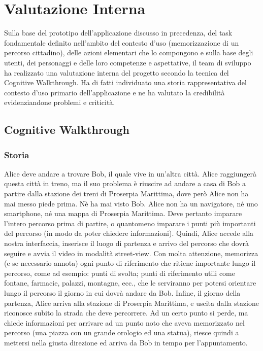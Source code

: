 \documentclass[12pt,a4paper,openright, notitlepage]{report}
\begin{document}

\chapter{Valutazione Interna}

Sulla base del prototipo dell’applicazione discusso in precedenza, del task fondamentale definito nell’ambito del contesto d’uso (memorizzazione di un percorso cittadino), delle azioni elementari che lo compongono e sulla base degli utenti, dei personaggi e delle loro competenze e aspettative, il team di sviluppo ha realizzato una valutazione interna del progetto secondo la tecnica del Cognitive Walkthrough. Ha di fatti individuato una storia rappresentativa del contesto d’uso primario dell’applicazione e ne ha valutato la credibilità evidenziandone problemi e criticità.

\section{Cognitive Walkthrough}

\subsection{Storia}

Alice deve andare a trovare Bob, il quale vive in un’altra città. Alice raggiungerà questa città in treno, ma il suo problema è riuscire ad andare a casa di Bob a partire dalla stazione dei treni di Proserpia Marittima, dove però Alice non ha mai messo piede prima. Nè ha mai visto Bob. Alice non ha un navigatore, né uno smartphone, né una mappa di Proserpia Marittima. Deve pertanto imparare l’intero percorso prima di partire, o quantomeno imparare i punti più importanti del percorso (in modo da poter chiedere informazioni). Quindi, Alice accede alla nostra interfaccia, inserisce il luogo di partenza e arrivo del percorso che dovrà seguire e avvia il video in modalità street-view. Con molta attenzione, memorizza (e se necessario annota) ogni punto di riferimento che ritiene importante lungo il percorso, come ad esempio: punti di svolta; punti di riferimento utili come fontane, farmacie, palazzi, montagne, ecc., che le serviranno per potersi orientare lungo il percorso il giorno in cui dovrà andare da Bob. Infine, il giorno della partenza, Alice arriva alla stazione di Proserpia Marittima, e uscita dalla stazione riconosce subito la strada che deve percorrere. Ad un certo punto si perde, ma chiede informazioni per arrivare ad un punto noto che aveva memorizzato nel percorso (una piazza con un grande orologio ed una statua), riesce quindi a mettersi nella giusta direzione ed arriva da Bob in tempo per l’appuntamento.
\end{document}
